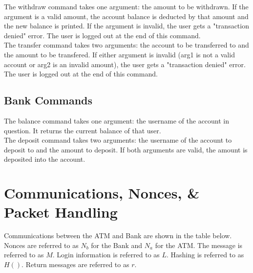 \documentclass[10pt,a4paper]{article}
\begin{document}
The withdraw command takes one argument: the amount to be withdrawn. If the argument is a valid amount, the account balance is deducted by that amount and the new balance is printed. If the argument is invalid, the user gets a "transaction denied" error. The user is logged out at the end of this command.\\

The transfer command takes two arguments: the account to be transferred to and the amount to be transfered. If either argument is invalid (arg1 is not a valid account or arg2 is an invalid amount), the user gets a "transaction denied" error. The user is logged out at the end of this command.

\subsection{Bank Commands}

The balance command takes one argument: the username of the account in question. It returns the current balance of that user.\\

The deposit command takes two arguments: the username of the account to deposit to and the amount to deposit. If both arguments are valid, the amount is deposited into the account.\\

\section{Communications, Nonces, \& Packet Handling}

Communications between the ATM and Bank are shown in the table below. Nonces are referred to as $N_b$ for the Bank and $N_a$ for the ATM. The message is referred to as $M$. Login information is referred to as $L$. Hashing is referred to as $H()$. Return messages are referred to as $r$.\\
\end{document}
